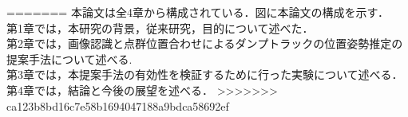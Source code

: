 =======
本論文は全4章から構成されている．図に本論文の構成を示す．\\
第1章では，本研究の背景，従来研究，目的について述べた．\\
第2章では，画像認識と点群位置合わせによるダンプトラックの位置姿勢推定の提案手法について述べる.\\
第3章では，本提案手法の有効性を検証するために行った実験について述べる．\\
第4章では，結論と今後の展望を述べる．
>>>>>>> ca123b8bd16c7e58b1694047188a9bdca58692ef
